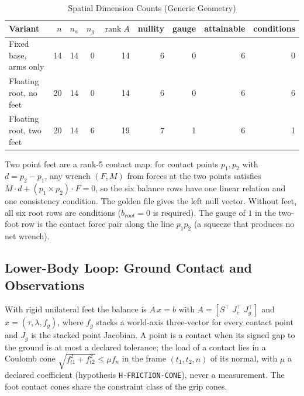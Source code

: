 \documentclass[11pt,a4paper]{article}
\newcommand{\rank}{\operatorname{rank}}
\begin{document}
\begin{table}[ht]
\centering
\caption{Spatial Dimension Counts (Generic Geometry)}
\label{tab:spatial}
\small
\begin{tabular}{@{}lrrrrrrrr@{}}
\toprule
Variant & $n$ & $n_a$ & $n_g$ & $\rank A$ & nullity & gauge & attainable & conditions \\
\midrule
Fixed base, arms only       & 14 & 14 & 0 & 14 & 6 & 0 & 6 & 0 \\
Floating root, no feet      & 20 & 14 & 0 & 14 & 6 & 0 & 6 & 6 \\
Floating root, two feet     & 20 & 14 & 6 & 19 & 7 & 1 & 6 & 1 \\
\bottomrule
\end{tabular}
\end{table}

Two point feet are a rank-5 contact map: for contact points $p_1,p_2$ with
$d=p_2-p_1$, any wrench $(F,M)$ from forces at the two points satisfies
$M\cdot d+(p_1\times p_2)\cdot F=0$, so the six balance rows have one linear
relation and one consistency condition.  The golden file gives the left null
vector.  Without feet, all six root rows are conditions ($b_{root}=0$ is
required).  The gauge of $1$ in the two-foot row is the contact force pair
along the line $p_1p_2$ (a squeeze that produces no net wrench).

\subsection{Lower-Body Loop: Ground Contact and Observations}
\label{sec:lowerbody}

With rigid unilateral feet the balance is $A\,x=b$ with
$A=[S^{\top}\;J_c^{\top}\;J_g^{\top}]$ and
$x=(\tau,\lambda,f_g)$, where $f_g$ stacks a world-axis three-vector for every
contact point and $J_g$ is the stacked point Jacobian.  A point is a contact
when its signed gap to the ground is at most a declared tolerance; the load of
a contact lies in a Coulomb cone $\sqrt{f_{t1}^2+f_{t2}^2}\le\mu f_n$ in the
frame $(t_1,t_2,n)$ of its normal, with $\mu$ a declared coefficient
(hypothesis \texttt{H-FRICTION-CONE}), never a measurement.  The foot contact
cones share the constraint class of the grip cones.
\end{document}
